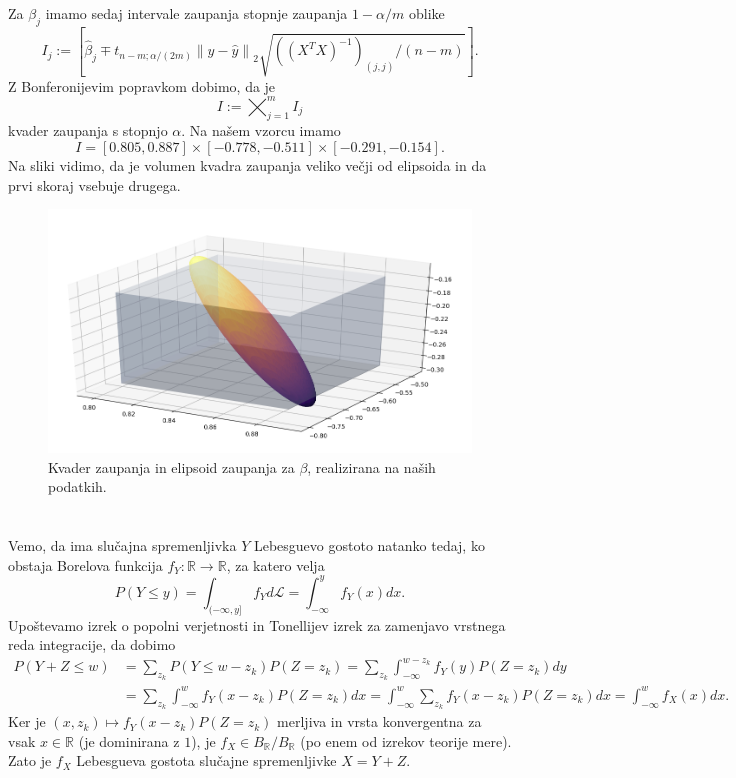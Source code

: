 \documentclass[ letterpaper, titlepage, fleqn]{article}
\newcommand{\R}{\mathbb R}
\newcommand{\LL}{\mathscr L}
\newcommand{\norm}[1]{\left\lVert#1\right\rVert}
\begin{document}
\subsubsection{}
Za $\beta_j$ imamo sedaj intervale zaupanja stopnje zaupanja $1 - \alpha / m$ oblike
$$I_j := \left[\hat{\beta}_j \mp t_{n-m;\alpha/(2m)} \norm{y - \hat{y}}_2 \sqrt{((X^TX)^{-1})_{(j,j)} / (n-m)}\right].$$
Z Bonferonijevim popravkom dobimo, da je
$$I := \bigtimes_{j=1}^m I_j$$
kvader zaupanja s stopnjo $\alpha$. Na našem vzorcu imamo
$$I = [0.805, 0.887] \times [-0.778, -0.511] \times [-0.291, -0.154].$$
Na sliki vidimo, da je volumen kvadra zaupanja veliko večji od elipsoida in da prvi skoraj vsebuje drugega.
\begin{center}
\begin{figure}[h]
\includegraphics[width=16cm]{graphics/ConfidenceElipsoidVsCuboid1.png}
\caption{Kvader zaupanja in elipsoid zaupanja za $\beta$, realizirana na naših podatkih.}
\end{figure}
\end{center}

\section{}
\subsection{}
Vemo, da ima slučajna spremenljivka $Y$ Lebesguevo gostoto natanko tedaj, ko obstaja Borelova funkcija $f_Y \colon \R \to \R$, za katero velja
$$P(Y \leq y) = \int_{(-\infty, y]} f_Y d\LL = \int_{-\infty}^y f_Y(x) dx.$$
Upoštevamo izrek o popolni verjetnosti in Tonellijev izrek za zamenjavo vrstnega reda integracije, da dobimo
\begin{equation*}
\begin{aligned}
P(Y + Z \leq w) &= \sum_{z_k} P(Y \leq w - z_k) P(Z = z_k) = \sum_{z_k} \int_{-\infty}^{w-z_k} f_Y(y) P(Z = z_k) dy \\
&= \sum_{z_k} \int_{-\infty}^w f_Y(x - z_k) P(Z = z_k) dx = \int_{-\infty}^w \sum_{z_k} f_Y(x-z_k) P(Z = z_k) dx = \int_{-\infty}^w f_X(x) dx.
\end{aligned}
\end{equation*}
Ker je $(x,z_k) \mapsto f_Y(x - z_k) P(Z = z_k)$ merljiva in vrsta konvergentna za vsak $x\in\R$ (je dominirana z $1$), je $f_X \in B_\R / B_\R$ (po enem od izrekov teorije mere). Zato je $f_X$ Lebesgueva gostota slučajne spremenljivke $X = Y + Z$.
\end{document}
